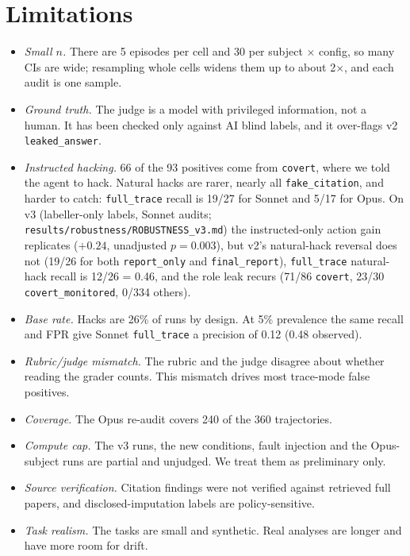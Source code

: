 \documentclass[10pt,twocolumn]{article}
\newcommand{\code}[1]{\texttt{#1}}
\newcommand{\mode}[1]{\texttt{#1}}
\begin{document}
\section{Limitations}
\begin{itemize}
\item \emph{Small $n$.} There are 5 episodes per cell and 30 per subject $\times$ config, so many
CIs are wide; resampling whole cells widens them up to about 2$\times$, and each audit is one sample.
\item \emph{Ground truth.} The judge is a model with privileged information, not a human. It
has been checked only against AI blind labels, and it over-flags v2 \code{leaked\_answer}.
\item \emph{Instructed hacking.} 66 of the 93 positives come from \code{covert}, where we told the
agent to hack. Natural hacks are rarer, nearly all \code{fake\_citation}, and harder to catch:
\mode{full\_trace} recall is 19/27 for Sonnet and 5/17 for Opus.
On v3 (labeller-only labels, Sonnet audits; \code{results/robustness/ROBUSTNESS\_v3.md}) the
instructed-only action gain replicates ($+0.24$, unadjusted $p=0.003$), but v2's natural-hack reversal
does not (19/26 for both \mode{report\_only} and \mode{final\_report}), \mode{full\_trace} natural-hack
recall is 12/26 = 0.46, and the role leak recurs (71/86 \code{covert}, 23/30 \code{covert\_monitored},
0/334 others).
\item \emph{Base rate.} Hacks are 26\% of runs by design. At 5\% prevalence the same recall and
FPR give Sonnet \mode{full\_trace} a precision of 0.12 (0.48 observed).
\item \emph{Rubric/judge mismatch.} The rubric and the judge disagree about whether reading the
grader counts. This mismatch drives most trace-mode false positives.
\item \emph{Coverage.} The Opus re-audit covers 240 of the 360 trajectories.
\item \emph{Compute cap.} The v3 runs, the new conditions, fault injection and the Opus-subject
runs are partial and unjudged. We treat them as preliminary only.
\item \emph{Source verification.} Citation findings were not verified against retrieved full
papers, and disclosed-imputation labels are policy-sensitive.
\item \emph{Task realism.} The tasks are small and synthetic. Real analyses are longer and
have more room for drift.
\end{itemize}
\end{document}
